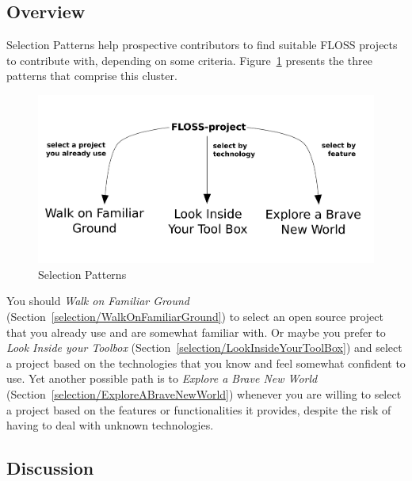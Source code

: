 \documentclass[12pt]{article}
\begin{document}
\subsection{Overview}

Selection Patterns help prospective contributors to find suitable FLOSS projects to contribute with, 
depending on some criteria. 
Figure~\ref{fig:selection} presents the three patterns that comprise this cluster.

\begin{figure}[hbt]
  \begin{center}
    \includegraphics[width=\textwidth]{figures/selection}
  \end{center}
  \caption{Selection Patterns}
  \label{fig:selection}
\end{figure}

You should 
\textit{Walk on Familiar Ground} (Section~\ref{selection/WalkOnFamiliarGround})
to select  an open source project that you already use and are somewhat familiar with.
Or maybe you prefer to
\textit{Look Inside your Toolbox} (Section~\ref{selection/LookInsideYourToolBox})
and select a project based on the technologies that  you know and feel somewhat confident to use.  
Yet another possible path is to 
\textit{Explore a Brave New World} (Section~\ref{selection/ExploreABraveNewWorld}) 
whenever you are willing to select a project based on the features or functionalities 
it provides, despite the risk of having to deal with unknown technologies. 





\subsection{Discussion}
\end{document}
